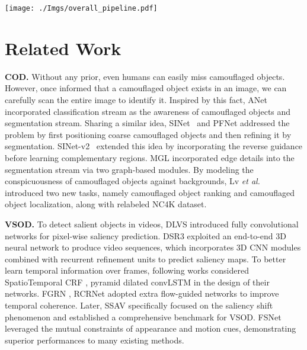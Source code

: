 \documentclass[10pt,twocolumn,letterpaper]{article}
\def\etal{\emph{et al.}}
\def\Ourmodel{SLT-Net}
\begin{document}
\begin{figure*}[ht]
\begin{center}
\texttt{[image: ./Imgs/overall\_pipeline.pdf]}
\end{center}
\vspace{-20pt}
\caption{The overall pipeline of the  \Ourmodel. The \Ourmodel~consists of a short-term detection module and a long-term refinement module. The short-term detection module takes a pair of consecutive frames and predicts the camouflaged object mask for the reference frame. The long-term refinement module takes $\mathrm{T}$ predictions from the short-term detection module along with their corresponding referenced frames to generate the final predictions.}
\label{fig:overall}
\end{figure*}


\section{Related Work}\label{sec:related_work}
\noindent\textbf{COD.} 
Without any prior, even humans can easily miss camouflaged objects. However, once informed that a camouflaged object exists in an image, we can carefully scan the entire image to identify it. 
Inspired by this fact, ANet~\cite{ltnghia-CVIU2019} incorporated classification stream as the awareness of camouflaged objects and segmentation stream. Sharing a similar idea, SINet~\cite{fan2020Camouflage} and PFNet \cite{mei2021camouflaged} addressed the problem by first positioning coarse camouflaged objects and then refining it by segmentation. SINet-v2~\cite{fan2021concealed} extended this idea by incorporating the reverse guidance before learning complementary regions. MGL \cite{zhai2021mutual} incorporated edge details into the segmentation stream via two graph-based modules. By modeling the conspicuousness of camouflaged objects against backgrounds, Lv \etal~\cite{lv2021simultaneously} introduced two new tasks, namely camouflaged object ranking and camouflaged object localization, along with relabeled NC4K dataset.  

\noindent\textbf{VSOD.}
To detect salient objects in videos, DLVS \cite{wang2017video} introduced fully convolutional networks for pixel-wise saliency prediction. DSR3 \cite{le2017deeply} exploited an end-to-end 3D neural network to produce video sequences, which incorporates 3D CNN modules combined with recurrent refinement units to predict saliency maps. To better learn temporal information over frames, following works considered SpatioTemporal CRF \cite{le2018video}, pyramid dilated convLSTM \cite{song2018pyramid} in the design of their networks. FGRN \cite{li2018flow}, RCRNet \cite{yan2019semi} adopted extra flow-guided networks to improve temporal coherence. Later, SSAV \cite{Fan2019VideoSal} specifically focused on the saliency shift phenomenon and established a comprehensive benchmark for VSOD. FSNet \cite{ji2021FSNet} leveraged the mutual constraints of appearance and motion cues, demonstrating superior performances to many existing methods.
\end{document}
